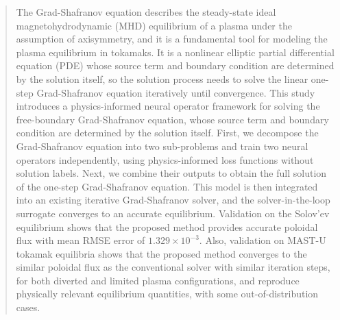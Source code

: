 \date{Received: date / Accepted: date}


\maketitle

\begin{abstract}
  The Grad-Shafranov equation describes the steady-state ideal magnetohydrodynamic 
  (MHD) equilibrium of a plasma under the assumption of axisymmetry, and 
  it is a fundamental tool for modeling the plasma equilibrium in tokamaks. 
  It is a nonlinear elliptic partial differential equation (PDE) whose source term and boundary condition
  are determined by the solution itself, so the solution process needs to solve 
  the linear one-step Grad-Shafranov equation iteratively until convergence.
  This study introduces a physics-informed neural operator framework 
  for solving the free-boundary Grad-Shafranov equation, 
  whose source term and boundary condition are determined by the solution itself.
  First, we decompose the Grad-Shafranov equation into two sub-problems
  and train two neural operators independently,
  using physics-informed loss functions without solution labels.
  Next, we combine their outputs to obtain the full solution of the 
  one-step Grad-Shafranov equation.
  This model is then integrated into an existing iterative Grad-Shafranov solver,
  and the solver-in-the-loop surrogate converges to an accurate equilibrium.
  Validation on the Solov'ev equilibrium 
  shows that the proposed method provides accurate poloidal flux with 
  mean RMSE error of $1.329\times 10^{-3}$.
  Also, validation on MAST-U tokamak equilibria 
  shows that the proposed method converges to the similar poloidal flux as the conventional solver
  with similar iteration steps,
  for both diverted and limited plasma configurations,
  and reproduce physically relevant equilibrium quantities, with some out-of-distribution
  cases.
\end{abstract}

